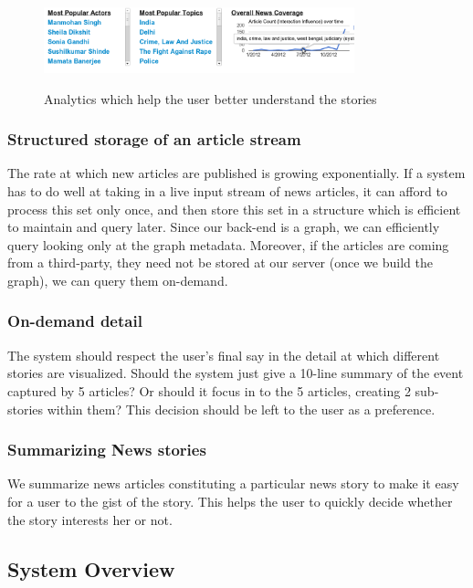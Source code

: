 \begin{figure}[ht]
\begin{center}
\caption{Analytics which help the user better understand the stories}
\includegraphics[width=9cm,scale=0.30]{figures/faceted2.png}
\label{fig:faceted-search}
\end{center}
\end{figure}

\subsubsection{Structured storage of an article stream}
The rate at which new articles are published is growing exponentially. If a system
has to do well at taking in a live input stream of news articles, it can afford to process this set only once, and then store this set in a structure
which is efficient to maintain and query later. Since our back-end is a graph, we can efficiently query looking only at the graph metadata. 
Moreover, if the articles are coming from a third-party, they need not be stored at our server (once we build the graph), we can query them on-demand. 

\subsubsection{On-demand detail}
The system should respect the user's final say in the detail at which different stories are visualized. Should the system
just give a 10-line summary of the event captured by 5 articles? Or should it focus in to the 5 articles, creating 2 sub-stories within them? This decision
should be left to the user as a preference.

\subsubsection{Summarizing News stories}
We summarize news articles constituting a particular news story to make it easy for a user to the gist of the story. This helps the user to quickly decide whether the story interests her or not.

\subsection{System Overview}
\label{sec:block}

